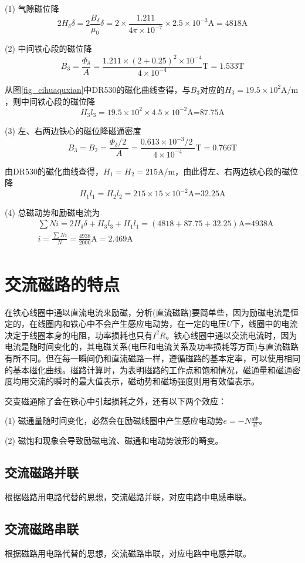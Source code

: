 \documentclass{book}
\begin{document}
(1)	气隙磁位降
\[2{{H}_{\delta }}\delta =2\frac{{{B}_{\delta }}}{{{\mu }_{0}}}\delta =2\times \frac{1.211}{4\pi \times {{10}^{-7}}}\times 2.5\times {{10}^{-3}}\text{A}=4818\text{A}\]

(2)	中间铁心段的磁位降
\[{{B}_{3}}=\frac{{{\Phi }_{\delta }}}{A}=\frac{1.211\times {{\left( 2+0.25 \right)}^{2}}\times {{10}^{-4}}}{4\times {{10}^{-4}}}\text{T}=1.533\text{T}\]

从图\ref{fig_cihuaquxian}中DR530的磁化曲线查得，与${{B}_{3}}$对应的${{H}_{3}}=19.5\times {{10}^{2}}\text{A/m}$，则中间铁心段的磁位降
\[{{H}_{3}}{{l}_{3}}=19.5\times {{10}^{2}}\times 4.5\times {{10}^{-2}}\text{A=87}\text{.75A}\]

(3)	左、右两边铁心的磁位降磁通密度
\[{{B}_{3}}={{B}_{2}}=\frac{{{{\Phi }_{\delta }}}/{2}\;}{A}=\frac{0.613\times {{{10}^{-3}}}/{2}\;}{4\times {{10}^{-4}}}\text{T}=0.766\text{T}\]

由DR530的磁化曲线查得，${{H}_{1}}={{H}_{2}}=215\text{A/m}$，由此得左、右两边铁心段的磁位降
\[{{H}_{1}}{{l}_{1}}={{H}_{2}}{{l}_{2}}=215\times 15\times {{10}^{-2}}\text{A=32}\text{.25A}\]

(4)	总磁动势和励磁电流为
\[\begin{aligned}
& \sum{Ni}=2{{H}_{\delta }}\delta +{{H}_{3}}{{l}_{3}}+{{H}_{1}}{{l}_{1}}=\left( 4818+87.75+32.25 \right)\text{A=4938A} \\ 
& i=\frac{\sum{Ni}}{N}=\frac{4938}{2000}\text{A}=2.469\text{A} \\ 
\end{aligned}\]

\section{交流磁路的特点}
在铁心线圈中通以直流电流来励磁，分析(直流磁路)要简单些，因为励磁电流是恒定的，在线圈内和铁心中不会产生感应电动势，在一定的电压$U$下，线圈中的电流决定于线圈本身的电阻，功率损耗也只有${{I}^{2}}R$。铁心线圈中通以交流电流时，因为电流是随时间变化的，其电磁关系(电压和电流关系及功率损耗等方面)与直流磁路有所不同。但在每一瞬间仍和直流磁路一样，遵循磁路的基本定率，可以使用相同的基本磁化曲线。磁路计算时，为表明磁路的工作点和饱和情况，磁通量和磁通密度均用交流的瞬时的最大值表示，磁动势和磁场强度则用有效值表示。

交变磁通除了会在铁心中引起损耗之外，还有以下两个效应：

(1)	磁通量随时间变化，必然会在励磁线圈中产生感应电动势$e=-N\frac{d\Phi }{dt}$。

(2)	磁饱和现象会导致励磁电流、磁通和电动势波形的畸变。

\subsection{交流磁路并联}
根据磁路用电路代替的思想，交流磁路并联，对应电路中电感串联。

\subsection{交流磁路串联}
根据磁路用电路代替的思想，交流磁路串联，对应电路中电感并联。
\end{document}
